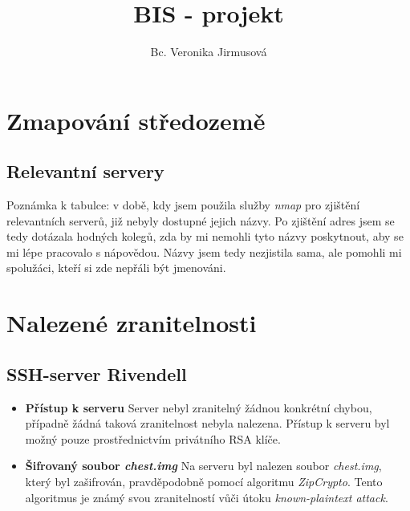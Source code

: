 \documentclass{article}
\title{BIS - projekt}
\author{Bc. Veronika Jirmusová
}
\begin{document}
\maketitle


\section{Zmapování středozemě}
\subsection{Relevantní servery}
Poznámka k tabulce: v době, kdy jsem použila služby \textit{nmap} pro zjištění relevantních serverů, již nebyly dostupné jejich názvy. Po zjištění adres jsem se tedy dotázala hodných kolegů, zda by mi nemohli tyto názvy poskytnout, aby se mi lépe pracovalo s nápovědou. Názvy jsem tedy nezjistila sama, ale pomohli mi spolužáci, kteří si zde nepřáli být jmenováni.
\begin{table}[h!]
\centering
{}
\caption{Seznam serverů a jejich služeb}
\end{table}

\section{Nalezené zranitelnosti}
\subsection{SSH-server Rivendell}
\begin{itemize}[leftmargin=2em]
    \item \textbf{Přístup k serveru}  
    Server nebyl zranitelný žádnou konkrétní chybou, případně žádná taková zranitelnost nebyla nalezena. Přístup k serveru byl možný pouze prostřednictvím privátního RSA klíče.

    \item \textbf{Šifrovaný soubor \textit{chest.img}}  
    Na serveru byl nalezen soubor \textit{chest.img}, který byl zašifrován, pravděpodobně pomocí algoritmu \textit{ZipCrypto}. Tento algoritmus je známý svou zranitelností vůči útoku \textit{known-plaintext attack}.

\end{itemize}
\end{document}
